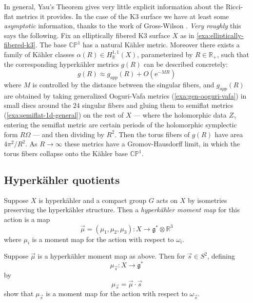 \documentclass[12pt,letterpaper,reqno]{article}
\numberwithin{equation}{section}
\newcommand{\fg}{{\mathfrak g}}
\newcommand{\R}{\ensuremath{\mathbb R}}
\newcommand{\C}{\ensuremath{\mathbb C}}
\newcommand{\PP}{\ensuremath{\mathbb P}}
\newcommand{\kahler}{K\"ahler\xspace}
\newcommand{\hk}{hyperk\"ahler\xspace}
\newcommand{\Hk}{Hyperk\"ahler\xspace}
\newcommand{\e}{{\mathrm e}}
\newcommand{\ti}[1]{\textit{#1}}
\begin{document}
In general, Yau's Theorem gives very little explicit information
about the Ricci-flat metrics it provides. In the case of the K3 surface
we have at least some \ti{asymptotic} information, thanks to the work
of Gross-Wilson \cite{MR1863732}.
\ti{Very roughly} this says the following.
Fix an elliptically fibered K3 surface $X$ as in
\autoref{exa:elliptically-fibered-k3}. The base $\C\PP^1$
has a natural \kahler metric.
Moreover there exists a family
of \kahler classes $\alpha(R) \in H^{1,1}_\R(X)$,
parameterized by $R \in \R_+$, such that the corresponding \hk metrics
$g(R)$ can be described concretely:
\begin{equation}
    g(R) \approx g_{app}(R) + O(\e^{-M R})
\end{equation}
where $M$ is controlled by the distance between the singular fibers,
and $g_{app}(R)$ are obtained by
taking generalized Ooguri-Vafa metrics (\autoref{exa:gen-ooguri-vafa})
in small discs around the $24$ singular fibers and gluing them to
semiflat metrics (\autoref{exa:semiflat-1d-general})
on the rest of $X$ --- where the holomorphic data $Z_\gamma$ entering
the semiflat metric
are certain periods of the holomorphic symplectic form
$R \Omega$ --- and then dividing by $R^2$.
Then the torus fibers of $g(R)$ have
area $4 \pi^2 / R^2$. As $R \to \infty$ these metrics
have a Gromov-Hausdorff limit,
in which the torus fibers collapse onto the \kahler base $\C\PP^1$.



\subsection{\Hk quotients}

\begin{defn}[\Hk moment map] Suppose $X$ is \hk and a compact group
$G$ acts on $X$ by isometries preserving the \hk structure.
Then a \ti{\hk moment map} for this action is a map
\begin{equation}
  \vec\mu = (\mu_1, \mu_2, \mu_3): X \to \fg^* \otimes \R^3
\end{equation}
where $\mu_i$ is a moment map for the action with respect
to $\omega_i$.
\end{defn}

\begin{exercise} Suppose $\vec\mu$ is a \hk moment map as above.
Then for $\vec s \in S^2$, defining
\begin{equation}
  \mu_{\vec s}: X \to \fg^*
\end{equation}
by
\begin{equation}
  \mu_{\vec s} = \vec\mu \cdot \vec s
\end{equation}
show that $\mu_{\vec s}$ is a moment map for the action
with respect to $\omega_{\vec s}$.
\end{exercise}
\end{document}
